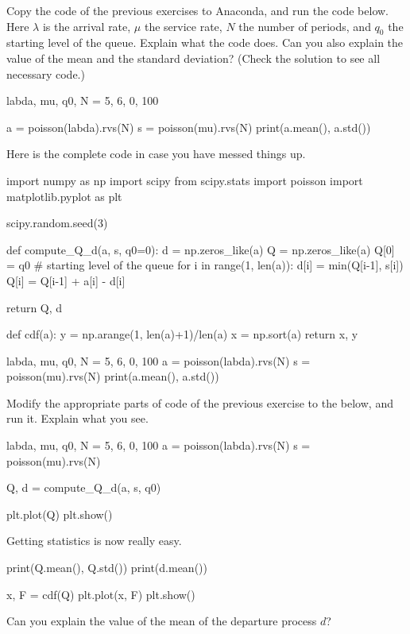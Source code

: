 \documentclass{scrartcl}
\begin{document}
\begin{exercise}
Copy the code of the previous exercises to Anaconda, and run the code below. Here $\lambda$ is the arrival rate, $\mu$ the service rate, $N$ the number of periods, and $q_0$ the starting level of the queue. Explain what the code does. Can you also explain the value of the mean and the standard deviation? (Check the solution to see all necessary code.) 

  \begin{pyverbatim}
labda, mu, q0, N = 5, 6, 0, 100

a = poisson(labda).rvs(N)
s = poisson(mu).rvs(N)
print(a.mean(), a.std())
\end{pyverbatim}
\begin{solution}
  Here is the complete code in case you have messed things up.

\begin{pyverbatim}
import numpy as np
import scipy
from scipy.stats import poisson
import matplotlib.pyplot as plt

scipy.random.seed(3) 


def compute_Q_d(a, s, q0=0):
    d = np.zeros_like(a)
    Q = np.zeros_like(a)
    Q[0] = q0 # starting level of the queue
    for i in range(1, len(a)):
        d[i] = min(Q[i-1], s[i])
        Q[i] = Q[i-1] + a[i] - d[i]

    return Q, d

def cdf(a):
    y = np.arange(1, len(a)+1)/len(a)
    x = np.sort(a)
    return x, y
  

labda, mu, q0, N = 5, 6, 0, 100
a = poisson(labda).rvs(N)
s = poisson(mu).rvs(N)
print(a.mean(), a.std())
\end{pyverbatim}

\end{solution}
\end{exercise}

\begin{exercise}
  Modify  the appropriate parts of  code of the previous exercise to the below,  and run it. Explain what you see.

  \begin{pyverbatim}
labda, mu, q0, N = 5, 6, 0, 100
a = poisson(labda).rvs(N)
s = poisson(mu).rvs(N)

Q, d = compute_Q_d(a, s, q0)

plt.plot(Q)
plt.show()
  \end{pyverbatim}
\end{exercise}

\begin{exercise}
  Getting statistics is now really easy.
  \begin{pyverbatim}
print(Q.mean(), Q.std())
print(d.mean())
    
x, F = cdf(Q)
plt.plot(x, F)
plt.show()
  \end{pyverbatim}
Can you explain the value of the mean of the departure process $d$?
\end{exercise}
\end{document}
